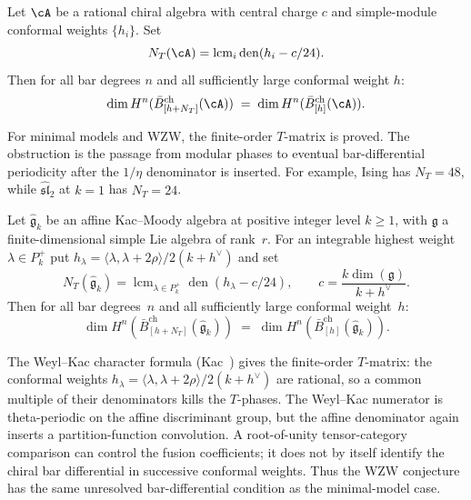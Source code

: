 \begin{conjecture}
\label{conj:modular-periodicity}
Let $\cA$ be a rational chiral algebra with central charge $c$ and
simple-module conformal weights $\{h_i\}$. Set
\[
N_T(\cA)=\operatorname{lcm}_i\operatorname{den}(h_i-c/24).
\]
Then for all bar degrees $n$ and all sufficiently large conformal weight $h$:
\[
\dim H^n(\bar{B}_{[h+N_T]}^{\mathrm{ch}}(\cA))
\;=\;
\dim H^n(\bar{B}_{[h]}^{\mathrm{ch}}(\cA)).
\]
\end{conjecture}

\begin{remark}\label{rem:modular-periodicity-scope}
For minimal models and WZW, the finite-order $T$-matrix is proved.
The obstruction is the passage from modular phases to eventual
bar-differential periodicity after the $1/\eta$ denominator is inserted.
For example, Ising has $N_T=48$, while
$\widehat{\mathfrak{sl}}_2$ at $k=1$ has $N_T=24$.
\end{remark}

\begin{conjecture}
\label{conj:modular-periodicity-wzw}
Let $\widehat{\mathfrak{g}}_k$ be an affine Kac--Moody algebra at
positive integer level $k \geq 1$, with $\mathfrak{g}$ a finite-dimensional
simple Lie algebra of rank~$r$. For an integrable highest weight
$\lambda\in P_k^+$ put
$h_\lambda=\langle\lambda,\lambda+2\rho\rangle/2(k+h^\vee)$ and set
\[
N_T(\widehat{\mathfrak g}_k)
=\operatorname{lcm}_{\lambda\in P_k^+}
\operatorname{den}(h_\lambda-c/24),
\qquad
c=\frac{k\dim(\mathfrak g)}{k+h^\vee}.
\]
Then for all bar degrees~$n$ and all sufficiently large conformal
weight~$h$:
\[
\dim H^n(\bar{B}_{[h+N_T]}^{\mathrm{ch}}(\widehat{\mathfrak{g}}_k))
\;=\;
\dim H^n(\bar{B}_{[h]}^{\mathrm{ch}}(\widehat{\mathfrak{g}}_k)).
\]
\end{conjecture}

\begin{evidence}
The Weyl--Kac character formula (Kac~\cite[\S12.7]{Kac}) gives the
finite-order $T$-matrix: the conformal weights
$h_\lambda=\langle\lambda,\lambda+2\rho\rangle/2(k+h^\vee)$ are rational,
so a common multiple of their denominators kills the $T$-phases. The
Weyl--Kac numerator is theta-periodic on the affine discriminant group,
but the affine denominator again inserts a partition-function
convolution. A root-of-unity tensor-category comparison can control the
fusion coefficients; it does not by itself identify the chiral bar
differential in successive conformal weights. Thus the WZW conjecture
has the same unresolved bar-differential condition as the minimal-model
case.
\end{evidence}

